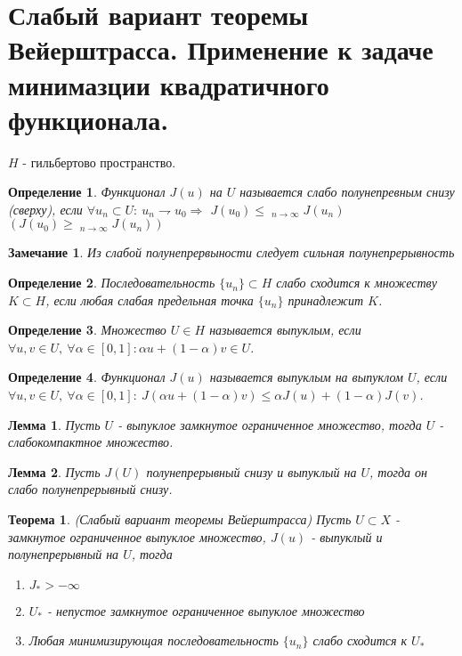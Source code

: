 \documentclass[9pt, a4paper]{extarticle}
\newtheorem*{theorem*}{Теорема}
\newtheorem*{lemma}{Лемма}
\newtheorem*{notabene}{Замечание}
\newtheorem*{definition}{Определение}
\DeclareMathOperator*\lowlim{\underline{lim}}
\DeclareMathOperator*\uplim{\overline{lim}}
\begin{document}
\section{Слабый вариант теоремы Вейерштрасса. Применение к задаче минимазции квадратичного функционала.}	
	$H$ - гильбертово пространство.
	\begin{definition}
	Функционал $J(u)$ на $U$ называется слабо полунепревным снизу (сверху), если $\forall {u_n} \subset U: \ u_n \rightharpoondown u_0  \Rightarrow$ $J(u_0) \leq \lowlim_{n\to\infty} J(u_n)$ $\left( J(u_0) \geq \uplim_{n\to\infty}J(u_n)\right)$
	\end{definition}
	\begin{notabene}
		Из слабой полунепрервыности следует сильная полунепрерывность
	\end{notabene}
	\begin{definition}
		Последовательность $\{u_n\} \subset H$ слабо сходится к множеству $K \subset H$, если любая слабая предельная точка $\{u_n\}$ принадлежит $K$.
	\end{definition}
	\begin{definition}
		Множество $U \in H$ называется выпуклым, если $\forall u, v \in U, \ \forall \alpha \in [0,1]: \alpha u + (1-\alpha) v \in U$. 
	\end{definition}
	\begin{definition}
		Функционал $J(u)$ называется выпуклым на выпуклом $U$, если $\forall u, v \in U, \ \forall \alpha \in [0,1]: \ J(\alpha u + (1-\alpha)v) \leq \alpha J(u) + (1-\alpha) J(v)$.
	\end{definition}
	\begin{lemma}
		Пусть $U$ - выпуклое замкнутое ограниченное множество, тогда $U$ - слабокомпактное множество. 
	\end{lemma}
	\begin{lemma}
		Пусть $J(U)$ полунепрерывный снизу и выпуклый на $U$, тогда он слабо полунепрерывный снизу.
	\end{lemma}
	\begin{theorem*}
	(Слабый вариант теоремы Вейерштрасса)\newline
	Пусть $U \subset X$ - замкнутое ограниченное выпуклое множество, $J(u)$ - выпуклый и полунепрерывный на $U$, тогда 
	\begin{enumerate}
		\item $J_* > -\infty$
		\item $U_*$ - непустое замкнутое ограниченное выпуклое множество
		\item Любая минимизирующая последовательность $\{u_n\}$ слабо сходится к $U_*$
	\end{enumerate}
	\end{theorem*}
\end{document}
